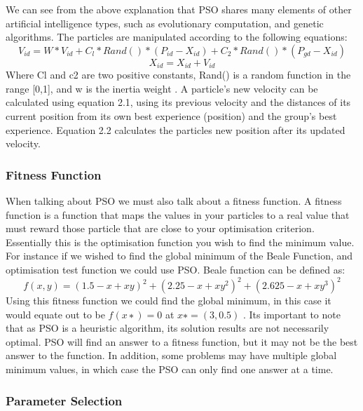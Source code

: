 \documentclass[oneside,12pt]{book}
\begin{document}
We can see from the above explanation that PSO shares many elements of other artificial intelligence types, such as evolutionary computation, and genetic algorithms. The particles are manipulated according to the following equations: 
\begin{equation}
V_{id} = W * V_{id} + C_l * Rand( ) * ( P_{id} - X_{id} ) + C_2 * Rand( ) * (P_{gd} - X_{id})
\end{equation}
\begin{equation}
X_{id} = X_{id} + V_{id}
\end{equation}
Where Cl and c2 are two positive constants, Rand() is a random function in the range [0,1], and w is the inertia weight \cite{shi1998parameter}. A particle's new velocity can be calculated using equation 2.1, using its previous velocity and the distances of its current position from its own best experience (position) and the group's best experience. Equation 2.2 calculates the particles new position after its updated velocity. 

\subsubsection{Fitness Function}
When talking about PSO we must also talk about a fitness function. A fitness function is a function that maps the values in your particles to a real value that must reward those particle that are close to your optimisation criterion. Essentially this is the optimisation function you wish to find the minimum value. For instance if we wished to find the global minimum of the Beale Function, and optimisation test function we could use PSO. Beale function can be defined as:
\begin{equation}
f(x, y) = (1.5-x+xy)^2+(2.25-x+xy^2)^2+(2.625-x+xy^3)^2
\end{equation}
Using this fitness function we could find the global minimum, in this case it would equate out to be $f(x∗)=0$ at $x∗=(3,0.5)$ \cite{bingham}. Its important to note that as PSO is a heuristic algorithm, its solution results are not necessarily optimal. PSO will find an answer to a fitness function, but it may not be the best answer to the function. In addition, some problems may have multiple global minimum values, in which case the PSO can only find one answer at a time. 

\subsubsection{Parameter Selection}
\end{document}
